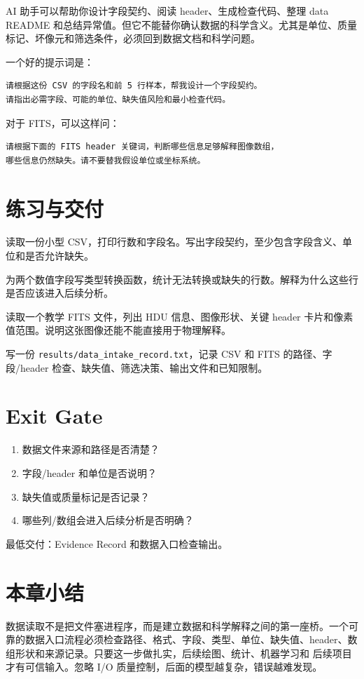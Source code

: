 AI 助手可以帮助你设计字段契约、阅读 header、生成检查代码、整理 data README 和总结异常值。但它不能替你确认数据的科学含义。尤其是单位、质量标记、坏像元和筛选条件，必须回到数据文档和科学问题。

一个好的提示词是：

\begin{lstlisting}[style=terminal]
请根据这份 CSV 的字段名和前 5 行样本，帮我设计一个字段契约。
请指出必需字段、可能的单位、缺失值风险和最小检查代码。
\end{lstlisting}

对于 FITS，可以这样问：

\begin{lstlisting}[style=terminal]
请根据下面的 FITS header 关键词，判断哪些信息足够解释图像数组，
哪些信息仍然缺失。请不要替我假设单位或坐标系统。
\end{lstlisting}

\section{练习与交付}

\begin{exercisebox}[基础练习]
读取一份小型 CSV，打印行数和字段名。写出字段契约，至少包含字段含义、单位和是否允许缺失。
\end{exercisebox}

\begin{exercisebox}[类型练习]
为两个数值字段写类型转换函数，统计无法转换或缺失的行数。解释为什么这些行是否应该进入后续分析。
\end{exercisebox}

\begin{exercisebox}[FITS 练习]
读取一个教学 FITS 文件，列出 HDU 信息、图像形状、关键 header 卡片和像素值范围。说明这张图像还能不能直接用于物理解释。
\end{exercisebox}

\begin{exercisebox}[交付练习]
写一份 \texttt{results/data\_intake\_record.txt}，记录 CSV 和 FITS 的路径、字段/header 检查、缺失值、筛选决策、输出文件和已知限制。
\end{exercisebox}

\section{Exit Gate}

\begin{enumerate}
    \item 数据文件来源和路径是否清楚？
    \item 字段/header 和单位是否说明？
    \item 缺失值或质量标记是否记录？
    \item 哪些列/数组会进入后续分析是否明确？
\end{enumerate}

最低交付：Evidence Record 和数据入口检查输出。

\section{本章小结}

数据读取不是把文件塞进程序，而是建立数据和科学解释之间的第一座桥。一个可靠的数据入口流程必须检查路径、格式、字段、类型、单位、缺失值、header、数组形状和来源记录。只要这一步做扎实，后续绘图、统计、机器学习和 后续项目才有可信输入。忽略 I/O 质量控制，后面的模型越复杂，错误越难发现。
